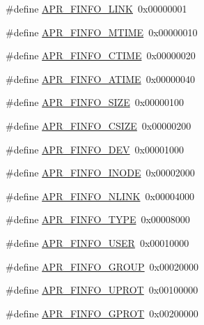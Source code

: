 \begin{DoxyCompactItemize}
\item 
\#define \hyperlink{group__apr__file__stat_ga9b0c1d02401b845f928f836fdd3c6712}{A\-P\-R\-\_\-\-F\-I\-N\-F\-O\-\_\-\-L\-I\-N\-K}~0x00000001
\item 
\#define \hyperlink{group__apr__file__stat_ga992ce1f4f75d519fd2a9d241c5a12515}{A\-P\-R\-\_\-\-F\-I\-N\-F\-O\-\_\-\-M\-T\-I\-M\-E}~0x00000010
\item 
\#define \hyperlink{group__apr__file__stat_ga98bef78baf71fa63b06352704f128bca}{A\-P\-R\-\_\-\-F\-I\-N\-F\-O\-\_\-\-C\-T\-I\-M\-E}~0x00000020
\item 
\#define \hyperlink{group__apr__file__stat_ga17d7656d02a35ffc05afe22032a8da15}{A\-P\-R\-\_\-\-F\-I\-N\-F\-O\-\_\-\-A\-T\-I\-M\-E}~0x00000040
\item 
\#define \hyperlink{group__apr__file__stat_gadf72493da450c0b1e3d279e98a973120}{A\-P\-R\-\_\-\-F\-I\-N\-F\-O\-\_\-\-S\-I\-Z\-E}~0x00000100
\item 
\#define \hyperlink{group__apr__file__stat_gaf87a09b89935d730cb1ade80d5b6ada0}{A\-P\-R\-\_\-\-F\-I\-N\-F\-O\-\_\-\-C\-S\-I\-Z\-E}~0x00000200
\item 
\#define \hyperlink{group__apr__file__stat_ga0890d31145211f62d38dd8e444b5660a}{A\-P\-R\-\_\-\-F\-I\-N\-F\-O\-\_\-\-D\-E\-V}~0x00001000
\item 
\#define \hyperlink{group__apr__file__stat_ga4fee7341395912db501b40de81dbba26}{A\-P\-R\-\_\-\-F\-I\-N\-F\-O\-\_\-\-I\-N\-O\-D\-E}~0x00002000
\item 
\#define \hyperlink{group__apr__file__stat_gabb2ba05b8ed45e59b1f06e1b7b4c91c2}{A\-P\-R\-\_\-\-F\-I\-N\-F\-O\-\_\-\-N\-L\-I\-N\-K}~0x00004000
\item 
\#define \hyperlink{group__apr__file__stat_gad5d25f25527ee77c08bb20aae141306c}{A\-P\-R\-\_\-\-F\-I\-N\-F\-O\-\_\-\-T\-Y\-P\-E}~0x00008000
\item 
\#define \hyperlink{group__apr__file__stat_ga599d92111a5cca379a06980025044e12}{A\-P\-R\-\_\-\-F\-I\-N\-F\-O\-\_\-\-U\-S\-E\-R}~0x00010000
\item 
\#define \hyperlink{group__apr__file__stat_ga8420798139d34a88678498aa848803ff}{A\-P\-R\-\_\-\-F\-I\-N\-F\-O\-\_\-\-G\-R\-O\-U\-P}~0x00020000
\item 
\#define \hyperlink{group__apr__file__stat_gac85e4335fcf91881b11b3e8a4b224aca}{A\-P\-R\-\_\-\-F\-I\-N\-F\-O\-\_\-\-U\-P\-R\-O\-T}~0x00100000
\item 
\#define \hyperlink{group__apr__file__stat_gadfa294303e34528b1fcae1bc009140c1}{A\-P\-R\-\_\-\-F\-I\-N\-F\-O\-\_\-\-G\-P\-R\-O\-T}~0x00200000

\end{DoxyCompactItemize}
